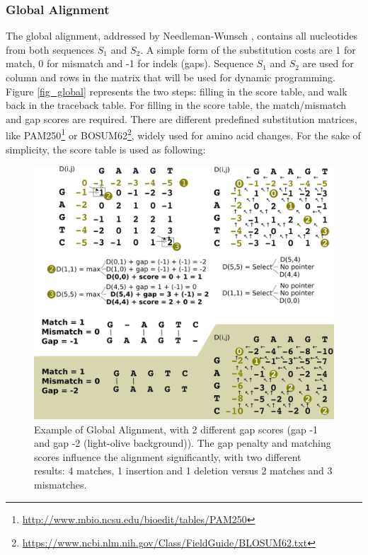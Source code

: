 \subsubsection{Global Alignment}
The global alignment, addressed by Needleman-Wunsch \cite{Needleman1970}, contains all nucleotides from both sequences $S_1$ and $S_2$. A simple form of the substitution costs are 1 for match, 0 for mismatch and -1 for indels (gaps). Sequence $S_1$ and $S_2$ are used for column and rows in the matrix that will be used for dynamic programming. Figure \ref{fig_global} represents the two steps: filling in the score table, and walk back in the traceback table. For filling in the score table, the match/mismatch and gap scores are required. There are different predefined substitution matrices, like PAM250\footnote{\url{http://www.mbio.ncsu.edu/bioedit/tables/PAM250}} or BOSUM62\footnote{\url{https://www.ncbi.nlm.nih.gov/Class/FieldGuide/BLOSUM62.txt}}, widely used for amino acid changes. For the sake of simplicity, the score table is used 
as following:
\begin{figure}[H]
\label{fig:global}
    \centering
    \includegraphics[width=1\textwidth]{images/globalAlign.png}
    \caption[Example of Global Alignment]{Example of Global Alignment, with 2 different gap scores (gap -1 and gap -2 (light-olive background)). The gap penalty and matching scores influence the alignment significantly, with two different results: 4 matches, 1 insertion and 1 deletion versus 2 matches and 3 mismatches.}
\end{figure}
